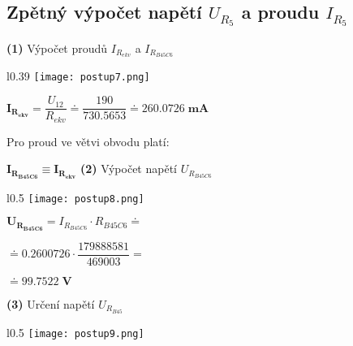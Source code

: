 \documentclass[a4paper,12pt]{article}
\begin{document}
\subsection{Zpětný výpočet napětí $U_{R_5}$ a proudu $I_{R_5}$}\par
\hspace{1em}\textbf{(1)} Výpočet proudů $I_{R_{ekv}}$ a $I_{R_{B45C6}}$\par
\begin{wrapfigure}{l}{0.39\textwidth}
\vspace{-40pt}
\texttt{[image: postup7.png]}
\vspace{-55pt}
\end{wrapfigure}
\vspace{20pt}
\hspace{1em}$\mathbf{I_{R_{ekv}}}=\dfrac{U_{12}}{R_{ekv}}\doteq \dfrac{190}{730.5653}\doteq \mathbf{ 260.0726 \;\si{\milli\ampere}}$\par\hspace{1em}Pro proud ve větvi obvodu platí:\par\hspace{1em}$\mathbf{I_{R_{B45C6}}\equiv I_{R_{ekv}}}$\newpage
\hspace{1em}\textbf{(2)} Výpočet napětí $U_{R_{B45C6}}$\par
\begin{wrapfigure}{l}{0.5\textwidth}
\vspace{-20pt}
\texttt{[image: postup8.png]}
\vspace{-40pt}
\end{wrapfigure}
\vspace{10pt}
\hspace{1em}$\mathbf{U_{R_{B45C6}}}=I_{R_{B45C6}}\cdot R_{B45C6}\doteq$\par\hspace{1em}$\doteq 0.2600726\cdot \dfrac{179888581}{469003}=$\par\hspace{1em}$\doteq \mathbf{ 99.7522 \;\si{\volt}}$\par\vspace{1.8em}
\hspace{1em}\textbf{(3)} Určení napětí $U_{R_{B45}}$\par
\begin{wrapfigure}{l}{0.5\textwidth}
\vspace{-67pt}
\texttt{[image: postup9.png]}
\vspace{-45pt}
\end{wrapfigure}
\end{document}
